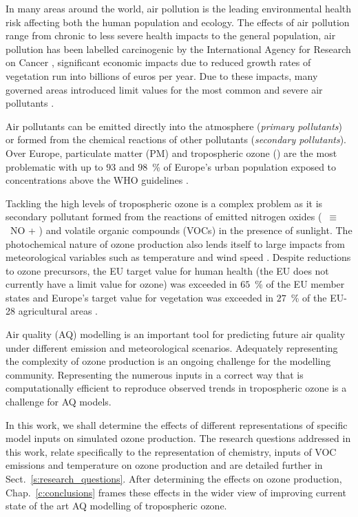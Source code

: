 In many areas around the world, air pollution is the leading environmental health risk affecting both the human population and ecology.
The effects of air pollution range from chronic to less severe health impacts to the general population, air pollution has been labelled carcinogenic by the International Agency for Research on Cancer \citep{IARC:2013}, significant economic impacts due to reduced growth rates of vegetation run into billions of euros per year.
Due to these impacts, many governed areas introduced limit values for the most common and severe air pollutants \citep{AQEU:2015}.

Air pollutants can be emitted directly into the atmosphere (\emph{primary pollutants}) or formed from the chemical reactions of other pollutants (\emph{secondary pollutants}).
Over Europe, particulate matter (PM) and tropospheric ozone () are the most problematic with up to $93$ and $98$~\% of Europe's urban population exposed to concentrations above the WHO guidelines \citep{AQEU:2015}.

Tackling the high levels of tropospheric ozone is a complex problem as it is secondary pollutant formed from the reactions of emitted nitrogen oxides (~$\equiv$~NO + ) and volatile organic compounds (VOCs) in the presence of sunlight.
The photochemical nature of ozone production also lends itself to large impacts from meteorological variables such as temperature and wind speed \citep{Jacob:2009}.
Despite reductions to ozone precursors, the EU target value for human health (the EU does not currently have a  limit value for ozone) was exceeded in $65$~\% of the EU member states and Europe's target value for vegetation was exceeded in $27$~\% of the EU-28 agricultural areas \citep{AQEU:2013}.

Air quality (AQ) modelling is an important tool for predicting future air quality under different emission and meteorological scenarios.
Adequately representing the complexity of ozone production is an ongoing challenge for the modelling community.
Representing the numerous inputs in a correct way that is computationally efficient to reproduce observed trends in tropospheric ozone is a challenge for AQ models.

In this work, we shall determine the effects of different representations of specific model inputs on simulated ozone production.
The research questions addressed in this work, relate specifically to the representation of chemistry, inputs of VOC emissions and temperature on ozone production and are detailed further in Sect.~\ref{s:research_questions}.
After determining the effects on ozone production, Chap.~\ref{c:conclusions} frames these effects in the wider view of improving current state of the art AQ modelling of tropospheric ozone.

